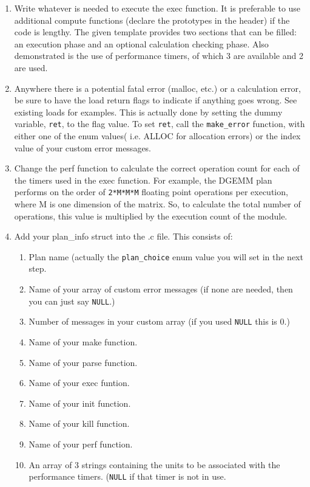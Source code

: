 \begin{enumerate}
        \item Write whatever is needed to execute the exec function. It is preferable to use additional compute functions (declare the prototypes in the header) if the code is lengthy. The given template provides two sections that can be filled: an execution phase and an optional calculation checking phase. Also demonstrated is the use of performance timers, of which 3 are available and 2 are used.
        \item Anywhere there is a potential fatal error (malloc, etc.) or a calculation error, be sure to have the load return flags to indicate if anything goes wrong. See existing loads for examples. This is actually done by setting the dummy variable, \verb!ret!, to the flag value. To set \verb!ret!, call the \verb!make_error! function, with either one of the enum values( i.e. ALLOC for allocation errors) or the index value of your custom error messages.
	\item Change the perf function to calculate the correct operation count for each of the timers used in the exec function. For example, the DGEMM plan performs on the order of \verb!2*M*M*M! floating point operations per execution, where M is one dimension of the matrix. So, to calculate the total number of operations, this value is multiplied by the execution count of the module.
	\item Add your plan\_info struct into the .c file. This consists of:
		\begin{enumerate}
			\item Plan name (actually the \verb!plan_choice! enum value you will set in the next step.
			\item Name of your array of custom error messages (if none are needed, then you can just say \verb!NULL!.)
			\item Number of messages in your custom array (if you used \verb!NULL! this is 0.)
			\item Name of your make function.
			\item Name of your parse function.
			\item Name of your exec funtion.
			\item Name of your init function.
			\item Name of your kill function.
			\item Name of your perf function.
			\item An array of 3 strings containing the units to be associated with the performance timers. (\verb!NULL! if that timer is not in use.
		\end{enumerate}

\end{enumerate}

